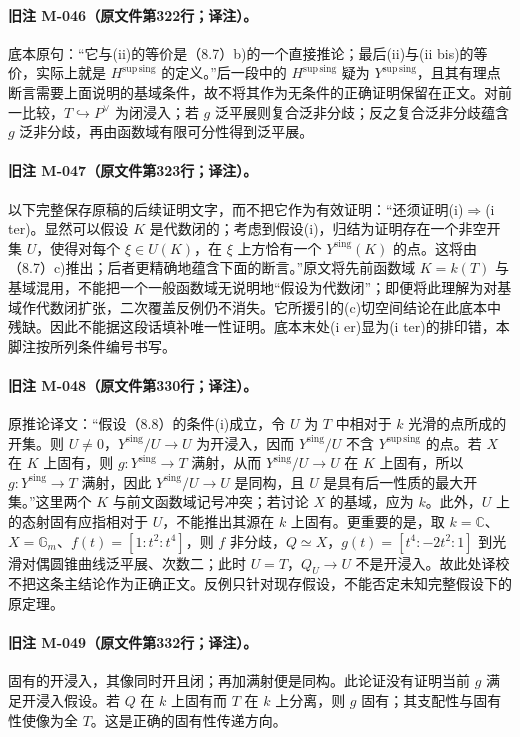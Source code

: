 \documentclass[UTF8,a4paper]{ctexbook}
\begin{document}
\paragraph{旧注 M-046（原文件第322行；译注）。}
底本原句：“它与(ii)的等价是（8.7）b)的一个直接推论；最后(ii)与(ii bis)的等价，实际上就是 $H^{\mathrm{sup\,sing}}$ 的定义。”后一段中的 $H^{\mathrm{sup\,sing}}$ 疑为 $Y^{\mathrm{sup\,sing}}$，且其有理点断言需要上面说明的基域条件，故不将其作为无条件的正确证明保留在正文。对前一比较，$T\hookrightarrow P^\vee$ 为闭浸入；若 $g$ 泛平展则复合泛非分歧；反之复合泛非分歧蕴含 $g$ 泛非分歧，再由函数域有限可分性得到泛平展。

\paragraph{旧注 M-047（原文件第323行；译注）。}
以下完整保存原稿的后续证明文字，而不把它作为有效证明：“还须证明(i)$\Rightarrow$(i ter)。显然可以假设 $K$ 是代数闭的；考虑到假设(i)，归结为证明存在一个非空开集 $U$，使得对每个 $\xi\in U(K)$，在 $\xi$ 上方恰有一个 ${Y^{\mathrm{sing}}}(K)$ 的点。这将由（8.7）c)推出；后者更精确地蕴含下面的断言。”原文将先前函数域 $K=k(T)$ 与基域混用，不能把一个一般函数域无说明地“假设为代数闭”；即便将此理解为对基域作代数闭扩张，二次覆盖反例仍不消失。它所援引的(c)切空间结论在此底本中残缺。因此不能据这段话填补唯一性证明。底本末处(i er)显为(i ter)的排印错，本脚注按所列条件编号书写。

\paragraph{旧注 M-048（原文件第330行；译注）。}
原推论译文：“假设（8.8）的条件(i)成立，令 $U$ 为 $T$ 中相对于 $k$ 光滑的点所成的开集。则 $U\ne0$，${Y^{\mathrm{sing}}}/U\to U$ 为开浸入，因而 ${Y^{\mathrm{sing}}}/U$ 不含 ${Y^{\mathrm{sup\,sing}}}$ 的点。若 $X$ 在 $K$ 上固有，则 $g:{Y^{\mathrm{sing}}}\to T$ 满射，从而 ${Y^{\mathrm{sing}}}/U\to U$ 在 $K$ 上固有，所以 $g:{Y^{\mathrm{sing}}}\to T$ 满射，因此 ${Y^{\mathrm{sing}}}/U\to U$ 是同构，且 $U$ 是具有后一性质的最大开集。”这里两个 $K$ 与前文函数域记号冲突；若讨论 $X$ 的基域，应为 $k$。此外，$U$ 上的态射固有应指相对于 $U$，不能推出其源在 $k$ 上固有。更重要的是，取 $k=\mathbb C$、$X=\mathbb G_m$、$f(t)=[1:t^2:t^4]$，则 $f$ 非分歧，$Q\simeq X$，$g(t)=[t^4:-2t^2:1]$ 到光滑对偶圆锥曲线泛平展、次数二；此时 $U=T$，$Q_U\to U$ 不是开浸入。故此处译校不把这条主结论作为正确正文。反例只针对现存假设，不能否定未知完整假设下的原定理。

\paragraph{旧注 M-049（原文件第332行；译注）。}
固有的开浸入，其像同时开且闭；再加满射便是同构。此论证没有证明当前 $g$ 满足开浸入假设。若 $Q$ 在 $k$ 上固有而 $T$ 在 $k$ 上分离，则 $g$ 固有；其支配性与固有性使像为全 $T$。这是正确的固有性传递方向。
\end{document}
